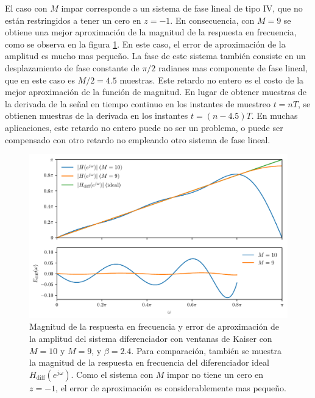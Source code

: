 \documentclass[a4paper]{report}
\begin{document}
El caso con \(M\) impar corresponde a un sistema de fase lineal de tipo IV, que no están restringidos a tener un cero en \(z=-1\). En consecuencia, con \(M=9\) se obtiene una mejor aproximación de la magnitud de la respuesta en frecuencia, como se observa en la figura \ref{fig:filter_design_windowing_kaiser_differentiator_approx_error}. En este caso, el error de aproximación de la amplitud es mucho mas pequeño. La fase de este sistema también consiste en un desplazamiento de fase constante de \(\pi/2\) radianes mas componente de fase lineal, que en este caso es \(M/2=4.5\) muestras. Este retardo no entero es el costo de la mejor aproximación de la función de magnitud. En lugar de obtener muestras de la derivada de la señal en tiempo continuo en los instantes de muestreo \(t=nT\), se obtienen muestras de la derivada en los instantes \(t=(n-4.5)T\). En muchas aplicaciones, este retardo no entero puede no ser un problema, o puede ser compensado con otro retardo no empleando otro sistema de fase lineal. 
\begin{figure}[!htb]
 \begin{center}
 \includegraphics[width=1\textwidth]{figuras/filter_design_windowing_kaiser_differentiator_approx_error.pdf}
 \caption{\label{fig:filter_design_windowing_kaiser_differentiator_approx_error} Magnitud de la respuesta en frecuencia  y error de aproximación de la amplitud del sistema diferenciador con ventanas de Kaiser con \(M=10\) y \(M=9\), y \(\beta=2.4\). Para comparación, también se muestra la magnitud de la respuesta en frecuencia del diferenciador ideal \(H_\textrm{diff}(e^{j\omega})\). Como el sistema con \(M\) impar no tiene un cero en \(z=-1\), el error de aproximación es considerablemente mas pequeño.}
 \end{center}
\end{figure}
\end{document}
